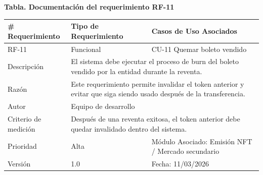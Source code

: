 \documentclass[12pt,letterpaper]{article}
\begin{document}
\noindent
\begin{minipage}{\textwidth}
\centering
\scriptsize
\renewcommand{\arraystretch}{0.9}
\setlength{\tabcolsep}{3pt}
\setlength{\arrayrulewidth}{0.5pt}

\textbf{Tabla. Documentación del requerimiento RF-11}

\vspace{2pt}

\begin{tabularx}{\textwidth}{|p{2.6cm}|X|p{3.4cm}|}
\hline
\# Requerimiento & Tipo de Requerimiento & Casos de Uso Asociados \\ \hline
RF-11 & Funcional & CU-11 Quemar boleto vendido \\ \hline
Descripción & \multicolumn{2}{X|}{El sistema debe ejecutar el proceso de burn del boleto vendido por la entidad durante la reventa.} \\ \hline
Razón & \multicolumn{2}{X|}{Este requerimiento permite invalidar el token anterior y evitar que siga siendo usado después de la transferencia.} \\ \hline
Autor & \multicolumn{2}{X|}{Equipo de desarrollo} \\ \hline
Criterio de medición & \multicolumn{2}{X|}{Después de una reventa exitosa, el token anterior debe quedar invalidado dentro del sistema.} \\ \hline
Prioridad & Alta & Módulo Asociado: Emisión NFT / Mercado secundario \\ \hline
Versión & 1.0 & Fecha: 11/03/2026 \\ \hline
\end{tabularx}
\end{minipage}

\vspace{0.2cm}
\end{document}
